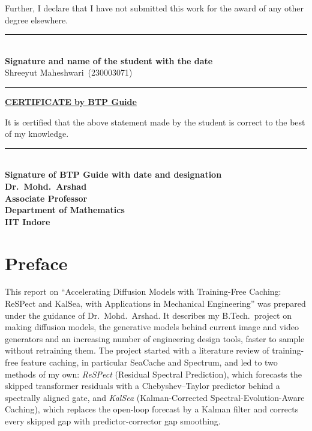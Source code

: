 \documentclass[12pt,a4paper,oneside]{report}
\theoremstyle{definition}
\theoremstyle{remark}
\newcommand{\thesistitle}{Accelerating Diffusion Models with Training-Free Caching: ReSPect and KalSea, with Applications in Mechanical Engineering}
\newcommand{\studentname}{Shreeyut Maheshwari}
\newcommand{\rollno}{230003071}
\newcommand{\guidename}{Dr.\ Mohd.\ Arshad}
\newcommand{\guidedesig}{Associate Professor}
\newcommand{\guidedept}{Department of Mathematics}
\begin{document}
\medskip
Further, I declare that I have not submitted this work for the award of any other degree elsewhere.

\vspace{1.6cm}
\begin{flushright}
\rule{6cm}{0.4pt}\\
\textbf{Signature and name of the student with the date}\\
\studentname\ (\rollno)
\end{flushright}
\noindent\rule{\textwidth}{1pt}
\begin{center}
{\large\bfseries\underline{CERTIFICATE by BTP Guide}}
\end{center}
\vspace{0.3cm}
\noindent It is certified that the above statement made by the student is correct to the best of my knowledge.

\vspace{1.8cm}
\begin{flushright}
\rule{6cm}{0.4pt}\\
\textbf{Signature of BTP Guide with date and designation}\\
\textbf{\guidename}\\
\textbf{\guidedesig}\\
\textbf{\guidedept}\\
\textbf{IIT Indore}
\end{flushright}

\chapter*{Preface}
This report on ``\thesistitle'' was prepared under the guidance of \guidename. It describes my B.Tech.\ project on making diffusion models, the generative models behind current image and video generators and an increasing number of engineering design tools, faster to sample without retraining them. The project started with a literature review of training-free feature caching, in particular SeaCache and Spectrum, and led to two methods of my own: \emph{ReSPect} (Residual Spectral Prediction), which forecasts the skipped transformer residuals with a Chebyshev--Taylor predictor behind a spectrally aligned gate, and \emph{KalSea} (Kalman-Corrected Spectral-Evolution-Aware Caching), which replaces the open-loop forecast by a Kalman filter and corrects every skipped gap with predictor-corrector gap smoothing.
\end{document}

